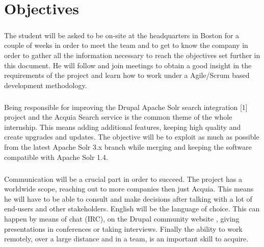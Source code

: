 \chapter{Objectives}
\paragraph{}
The student will be asked to be on-site at the headquarters in Boston for a couple of weeks in order to meet the team and to get to know the company in order to gather all the information necessary to reach the objectives set further in this document. He will follow and join meetings to obtain a good insight in the requirements of the project and learn how to work under a Agile/Scrum based development methodology.
\paragraph{}
Being responsible for improving the Drupal Apache Solr search integration [1] project and the Acquia Search service is the common theme of the whole internship. This means adding additional features, keeping high quality and create upgrades and updates. The objective will be to exploit as much as possible from the latest Apache Solr 3.x branch while merging and keeping the software compatible with Apache Solr 1.4.

\paragraph{}
Communication will be a crucial part in order to succeed. The project has a worldwide scope, reaching out to more companies then just Acquia. This means he will have to be able to consult and make decisions after talking with a lot of end-users and other stakeholders. English will be the language of choice. This can happen by means of chat (IRC), on the Drupal community website \cite{drupal_site}, giving presentations in conferences or taking interviews.
Finally the ability to work remotely, over a large distance and in a team, is an important skill to acquire.

